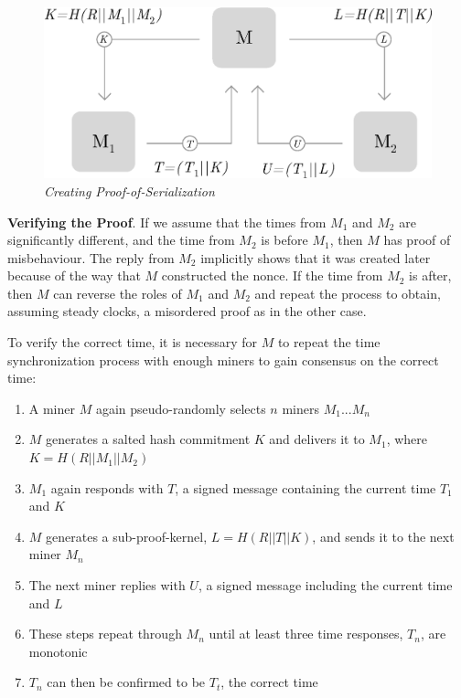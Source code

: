 \documentclass[UTF8, 10pt, nonatbib, nocopyrightspace, reprint]{sigplanconf}
\begin{document}
\begin{figure}[ht]
    \begin{center}
          \includegraphics[width=\columnwidth]{serialization.eps}
          \caption{\emph{Creating Proof-of-Serialization}}
          \label{fig:serialization}
     \end{center}
\end{figure}

\textbf{Verifying the Proof}. If we assume that the times from $M_1$ and $M_2$ are significantly different, and the time from $M_2$ is before $M_1$, then $M$ has proof of misbehaviour. The reply from $M_2$ implicitly shows that it was created later because of the way that $M$ constructed the nonce. If the time from $M_2$ is after, then $M$ can reverse the roles of $M_1$ and $M_2$ and repeat the process to obtain, assuming steady clocks, a misordered proof as in the other case.

To verify the correct time, it is necessary for $M$ to repeat the time synchronization process with enough miners to gain consensus on the correct time:

\begin{enumerate}
    \item A miner $M$ again pseudo-randomly selects $n$ miners $M_1$...$M_n$
    \item $M$ generates a salted hash commitment $K$ and delivers it to $M_1$, where ${K = H\left(R || M_1 || M_2\right)}$
    \item $M_1$ again responds with $T$, a signed message containing the current time $T_1$ and $K$
    \item $M$ generates a sub-proof-kernel, $L = H\left(R || T || K\right)$, and sends it to the next miner $M_n$
    \item The next miner replies with $U$, a signed message including the current time and $L$
    \item These steps repeat through $M_n$ until at least three time responses, $T_n$, are monotonic
    \item $T_n$ can then be confirmed to be $T_t$, the correct time
\end{enumerate}
\end{document}
